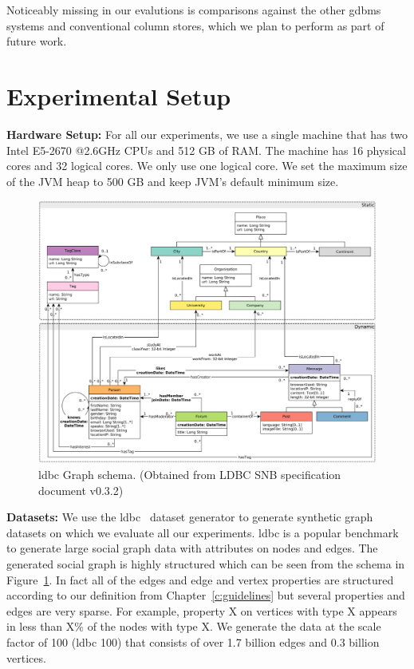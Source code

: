Noticeably missing in our evalutions is comparisons against the other \gls{gdbms} systems and conventional column stores, which we plan to perform as part of future work.

\section{Experimental Setup}

\noindent \textbf{Hardware Setup:} For all our experiments, we use a single machine that has two Intel E5-2670 @2.6GHz CPUs and 512 GB of RAM. The machine has 16 physical cores and 32 logical cores. We only use one logical core. We set the maximum size of the JVM heap to 500 GB and keep JVM’s default minimum size.

\begin{figure}
	\centering
	\includegraphics[scale=0.42]{img/ldbc-schema}
	\captionsetup{justification=centering}
	\caption{\gls{ldbc} Graph schema. (Obtained from LDBC SNB specification document v0.3.2)}
	\label{fig:ldbc-schema}
\end{figure}

\noindent \textbf{Datasets:} We use the \gls{ldbc}~\cite{ldbc} dataset generator to generate synthetic graph datasets on which we evaluate all our experiments. \gls{ldbc} is a popular benchmark to generate large social graph data with attributes on nodes and edges. The generated social graph is highly structured which can be seen from the schema in Figure~\ref{fig:ldbc-schema}. In fact all of the edges and edge and vertex properties are structured according to our definition from Chapter~\ref{c:guidelines} but several properties and edges are very sparse. For example, property X on vertices with type X appears in less than X\% of the nodes with type X.  We generate the data at the scale factor of 100 (\gls{ldbc} 100) that consists of over 1.7 billion edges and 0.3 billion vertices.

